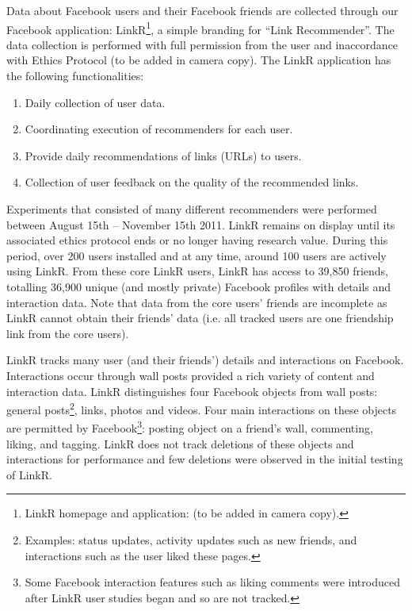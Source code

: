 
Data about Facebook users and their Facebook friends are collected through our Facebook application: LinkR\footnote{LinkR homepage and application: (to be added in camera copy).}, a simple branding for ``Link Recommender''. The data collection is performed with full permission from the user and inaccordance with Ethics Protocol (to be added in camera copy). The LinkR application has the following functionalities:
\begin{enumerate}
\item Daily collection of user data.
\item Coordinating execution of recommenders for each user.
\item Provide daily recommendations of links (URLs) to users.
\item Collection of user feedback on the quality of the recommended links.
\end{enumerate}
Experiments that consisted of many different recommenders were performed between August 15th -- November 15th 2011. LinkR remains on display until its associated ethics protocol ends or no longer having research value. During this period, over 200 users installed and at any time, around 100 users are actively using LinkR. From these core LinkR users, LinkR has access to 39,850 friends, totalling 36,900 unique (and mostly private) Facebook profiles with details and interaction data. Note that data from the core users' friends are incomplete as LinkR cannot obtain their friends' data (i.e. all tracked users are one friendship link from the core users).

LinkR tracks many user (and their friends') details and interactions on Facebook. Interactions occur through wall posts provided a rich variety of content and interaction data. LinkR distinguishes four Facebook objects from wall posts: general posts\footnote{Examples: status updates, activity updates such as new friends, and interactions such as the user liked these pages.}, links, photos and videos. Four main interactions on these objects are permitted by Facebook\footnote{Some Facebook interaction features such as liking comments were introduced after LinkR user studies began and so are not tracked.}: posting object on a friend's wall, commenting, liking, and tagging. LinkR does not track deletions of these objects and interactions for performance and few deletions were observed in the initial testing of LinkR.

